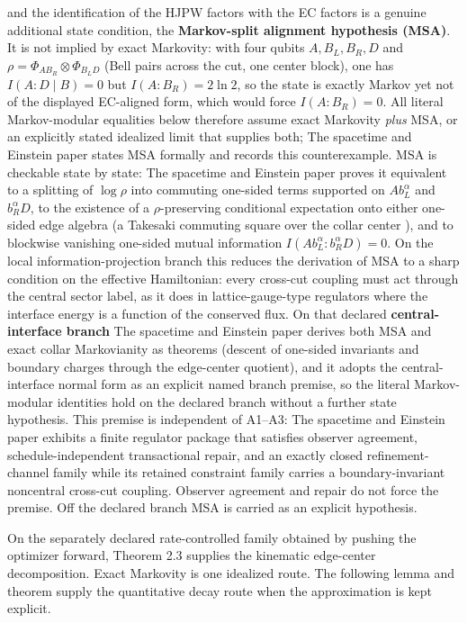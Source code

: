 and the identification of the HJPW factors with the EC factors is a genuine additional state condition, the \textbf{Markov-split alignment hypothesis (MSA)}. It is not implied by exact Markovity: with four qubits \(A,B_L,B_R,D\) and \(\rho=\Phi_{AB_R}\otimes\Phi_{B_LD}\) (Bell pairs across the cut, one center block), one has \(I(A:D\mid B)=0\) but \(I(A:B_R)=2\ln 2\), so the state is exactly Markov yet not of the displayed EC-aligned form, which would force \(I(A:B_R)=0\). All literal Markov-modular equalities below therefore assume exact Markovity \emph{plus} MSA, or an explicitly stated idealized limit that supplies both; The spacetime and Einstein paper states MSA formally and records this counterexample. MSA is checkable state by state: The spacetime and Einstein paper proves it equivalent to a splitting of \(\log\rho\) into commuting one-sided terms supported on \(A b_L^\alpha\) and \(b_R^\alpha D\), to the existence of a \(\rho\)-preserving conditional expectation onto either one-sided edge algebra (a Takesaki commuting square over the collar center \cite{takesaki72}), and to blockwise vanishing one-sided mutual information \(I(Ab_L^\alpha:b_R^\alpha D)=0\). On the local information-projection branch this reduces the derivation of MSA to a sharp condition on the effective Hamiltonian: every cross-cut coupling must act through the central sector label, as it does in lattice-gauge-type regulators where the interface energy is a function of the conserved flux. On that declared \textbf{central-interface branch} The spacetime and Einstein paper derives both MSA and exact collar Markovianity as theorems (descent of one-sided invariants and boundary charges through the edge-center quotient), and it adopts the central-interface normal form as an explicit named branch premise, so the literal Markov-modular identities hold on the declared branch without a further state hypothesis. This premise is independent of A1--A3: The spacetime and Einstein paper exhibits a finite regulator package that satisfies observer agreement, schedule-independent transactional repair, and an exactly closed refinement-channel family while its retained constraint family carries a boundary-invariant noncentral cross-cut coupling. Observer agreement and repair do not force the premise. Off the declared branch MSA is carried as an explicit hypothesis.

On the separately declared rate-controlled family obtained by pushing the optimizer forward, Theorem 2.3 supplies the kinematic edge-center decomposition. Exact Markovity is one idealized route. The following lemma and theorem supply the quantitative decay route when the approximation is kept explicit.

